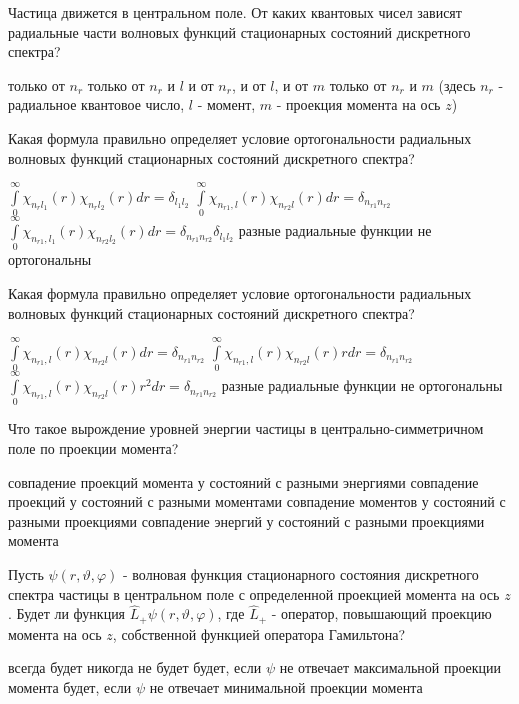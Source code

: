 \documentclass[11pt,a4paper]{exam}
\begin{document}
\begin{questions}
\question Частица движется в центральном поле. От каких квантовых чисел зависят радиальные части волновых функций стационарных состояний дискретного спектра?
\begin{choices}
\choice только от ${n_r}$       
\choice только от ${n_r}$ и $l$
\choice и от ${n_r}$, и от $l$, и от $m$    
\choice только от ${n_r}$ и $m$ 
(здесь ${n_r}$ - радиальное квантовое число, $l$ - момент, $m$ - проекция момента на ось $z$)
\end{choices}

\question Какая формула правильно определяет условие ортогональности радиальных волновых функций стационарных состояний дискретного спектра?
\begin{choices}
\choice $\int\limits_0^\infty  {{\chi _{{n_r}{l_1}}}(r)} {\chi _{{n_r}{l_2}}}(r)dr = {\delta _{{l_1}{l_2}}}$        
\choice $\int\limits_0^\infty  {{\chi _{{n_{r1}},l}}(r)} {\chi _{{n_{r2}}l}}(r)dr = {\delta _{{n_{r1}}{n_{r2}}}}$
\choice $\int\limits_0^\infty  {{\chi _{{n_{r1}},{l_1}}}(r)} {\chi _{{n_{r2}}{l_2}}}(r)dr = {\delta _{{n_{r1}}{n_{r2}}}}{\delta _{{l_1}{l_2}}}$      
\choice разные радиальные функции не ортогональны
\end{choices}

\question Какая формула правильно определяет условие ортогональности радиальных волновых функций стационарных состояний дискретного спектра?
\begin{choices}
\choice $\int\limits_0^\infty  {{\chi _{{n_{r1}},l}}(r)} {\chi _{{n_{r2}}l}}(r)dr = {\delta _{{n_{r1}}{n_{r2}}}}$         
\choice $\int\limits_0^\infty  {{\chi _{{n_{r1}},l}}(r)} {\chi _{{n_{r2}}l}}(r)rdr = {\delta _{{n_{r1}}{n_{r2}}}}$
\choice $\int\limits_0^\infty  {{\chi _{{n_{r1}},l}}(r)} {\chi _{{n_{r2}}l}}(r){r^2}dr = {\delta _{{n_{r1}}{n_{r2}}}}$    
\choice разные радиальные функции не ортогональны
\end{choices}

\question Что такое вырождение уровней энергии частицы в центрально-симметричном поле по проекции момента?
\begin{choices}
\choice совпадение проекций момента у состояний с разными энергиями
\choice совпадение проекций у состояний с разными моментами
\choice совпадение моментов у состояний с разными проекциями
\choice совпадение энергий у состояний с разными проекциями момента
\end{choices}

\question Пусть $\psi (r,\vartheta ,\varphi )$ - волновая функция стационарного состояния дискретного спектра частицы в центральном поле с определенной проекцией момента на ось $z$. Будет ли функция ${\hat L_ + }\psi (r,\vartheta ,\varphi )$, где ${\hat L_ + }$ - оператор, повышающий проекцию момента на ось $z$, собственной функцией оператора Гамильтона?
\begin{choices}
\choice всегда будет
\choice никогда не будет
\choice будет, если $\psi $ не отвечает максимальной проекции момента
\choice будет, если $\psi $ не отвечает минимальной проекции момента
\end{choices}


\end{questions}
\end{document}
